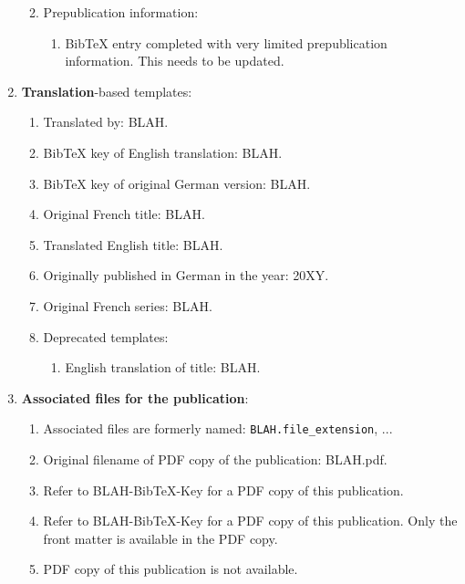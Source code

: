 \documentclass[letter,12pt]{article}
\begin{document}
\begin{enumerate}
\begin{enumerate}
\begin{enumerate}
\begin{enumerate}
			\end{enumerate}
		\end{enumerate}
	\item Prepublication information: \vspace{-0.2cm}
		\begin{enumerate} \itemsep -2pt
		\item BibTeX entry completed with very limited prepublication information. This needs to be updated.
		\end{enumerate}
	\end{enumerate}
\item {\bf Translation}-based templates: \vspace{-0.3cm}
	\begin{enumerate} \itemsep -2pt
	\item Translated by: BLAH.
	\item BibTeX key of English translation: BLAH.
	\item BibTeX key of original German version: BLAH.
	\item Original French title: BLAH.
	\item Translated English title: BLAH.
	\item Originally published in German in the year: 20XY.
	\item Original French series: BLAH.
	\item Deprecated templates: \vspace{-0.2cm}
		\begin{enumerate} \itemsep -2pt
		\item English translation of title: BLAH.
		\end{enumerate}
	\end{enumerate}
\item {\bf Associated files for the publication}: \vspace{-0.3cm}
	\begin{enumerate} \itemsep -2pt
	\item Associated files are formerly named: {\tt BLAH.file\_extension}, ...
	\item Original filename of PDF copy of the publication: BLAH.pdf.
	\item Refer to BLAH-BibTeX-Key for a PDF copy of this publication.
	\item Refer to BLAH-BibTeX-Key for a PDF copy of this publication. Only the front matter is available in the PDF copy.
	\item PDF copy of this publication is not available.
	\end{enumerate}

\end{enumerate}
\end{document}
